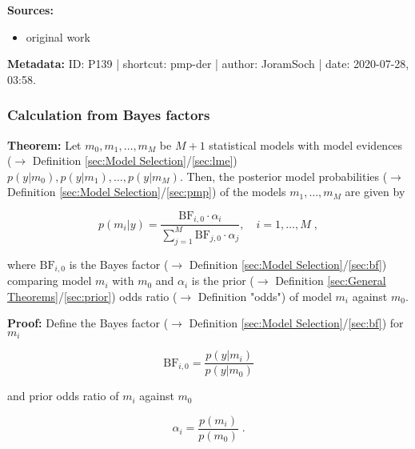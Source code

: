 \documentclass[a4paper,12pt,twoside]{book}
\begin{document}
\vspace{1em}
\textbf{Sources:}
\begin{itemize}
\item original work\end{itemize}


\vspace{1em}
\textbf{Metadata:} ID: P139 | shortcut: pmp-der | author: JoramSoch | date: 2020-07-28, 03:58.
\vspace{1em}



\subsubsection[\textbf{Calculation from Bayes factors}]{Calculation from Bayes factors} \label{sec:pmp-bf}
\setcounter{equation}{0}

\textbf{Theorem:} Let $m_0, m_1, \ldots, m_M$ be $M+1$ statistical models with model evidences ($\rightarrow$ Definition \ref{sec:Model Selection}/\ref{sec:lme}) $p(y \vert m_0), p(y \vert m_1), \ldots, p(y \vert m_M)$. Then, the posterior model probabilities ($\rightarrow$ Definition \ref{sec:Model Selection}/\ref{sec:pmp}) of the models $m_1, \ldots, m_M$ are given by

\begin{equation} \label{eq:pmp-bf-PMP-BF}
p(m_i|y) = \frac{\mathrm{BF}_{i,0} \cdot \alpha_i}{\sum_{j=1}^{M} \mathrm{BF}_{j,0} \cdot \alpha_j}, \quad i = 1,\ldots,M \; ,
\end{equation}

where $\mathrm{BF}_{i,0}$ is the Bayes factor ($\rightarrow$ Definition \ref{sec:Model Selection}/\ref{sec:bf}) comparing model $m_i$ with $m_0$ and $\alpha_i$ is the prior ($\rightarrow$ Definition \ref{sec:General Theorems}/\ref{sec:prior}) odds ratio ($\rightarrow$ Definition "odds") of model $m_i$ against $m_0$.


\vspace{1em}
\textbf{Proof:} Define the Bayes factor ($\rightarrow$ Definition \ref{sec:Model Selection}/\ref{sec:bf}) for $m_i$

\begin{equation} \label{eq:pmp-bf-BF-i0}
\mathrm{BF}_{i,0} = \frac{p(y|m_i)}{p(y|m_0)}
\end{equation}

and prior odds ratio of $m_i$ against $m_0$

\begin{equation} \label{eq:pmp-bf-prior-i0}
\alpha_i = \frac{p(m_i)}{p(m_0)} \; .
\end{equation}
\end{document}
